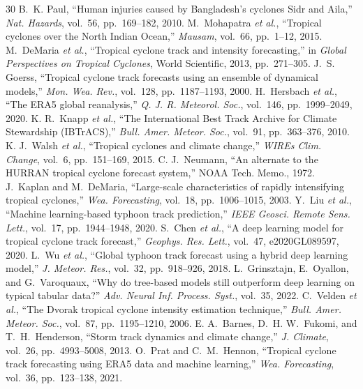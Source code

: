 \documentclass[11pt]{article}
\begin{document}
\begin{thebibliography}{30}
B.~K. Paul, ``Human injuries caused by Bangladesh's cyclones Sidr and Aila,'' \textit{Nat. Hazards}, vol.~56, pp.~169--182, 2010.
M.~Mohapatra \textit{et al.}, ``Tropical cyclones over the North Indian Ocean,'' \textit{Mausam}, vol.~66, pp.~1--12, 2015.
M.~DeMaria \textit{et al.}, ``Tropical cyclone track and intensity forecasting,'' in \textit{Global Perspectives on Tropical Cyclones}, World Scientific, 2013, pp.~271--305.
J.~S. Goerss, ``Tropical cyclone track forecasts using an ensemble of dynamical models,'' \textit{Mon. Wea. Rev.}, vol.~128, pp.~1187--1193, 2000.
H.~Hersbach \textit{et al.}, ``The ERA5 global reanalysis,'' \textit{Q. J. R. Meteorol. Soc.}, vol.~146, pp.~1999--2049, 2020.
K. R.~Knapp \textit{et al.}, ``The International Best Track Archive for Climate Stewardship (IBTrACS),'' \textit{Bull. Amer. Meteor. Soc.}, vol.~91, pp.~363--376, 2010.
K. J.~Walsh \textit{et al.}, ``Tropical cyclones and climate change,'' \textit{WIREs Clim. Change}, vol.~6, pp.~151--169, 2015.
C. J.~Neumann, ``An alternate to the HURRAN tropical cyclone forecast system,'' NOAA Tech. Memo., 1972.
J.~Kaplan and M.~DeMaria, ``Large-scale characteristics of rapidly intensifying tropical cyclones,'' \textit{Wea. Forecasting}, vol.~18, pp.~1006--1015, 2003.
Y.~Liu \textit{et al.}, ``Machine learning-based typhoon track prediction,'' \textit{IEEE Geosci. Remote Sens. Lett.}, vol.~17, pp.~1944--1948, 2020.
S.~Chen \textit{et al.}, ``A deep learning model for tropical cyclone track forecast,'' \textit{Geophys. Res. Lett.}, vol.~47, e2020GL089597, 2020.
L.~Wu \textit{et al.}, ``Global typhoon track forecast using a hybrid deep learning model,'' \textit{J. Meteor. Res.}, vol.~32, pp.~918--926, 2018.
L.~Grinsztajn, E.~Oyallon, and G.~Varoquaux, ``Why do tree-based models still outperform deep learning on typical tabular data?'' \textit{Adv. Neural Inf. Process. Syst.}, vol.~35, 2022.
C.~Velden \textit{et al.}, ``The Dvorak tropical cyclone intensity estimation technique,'' \textit{Bull. Amer. Meteor. Soc.}, vol.~87, pp.~1195--1210, 2006.
E. A.~Barnes, D.~H. W.~Fukomi, and T.~H.~Henderson, ``Storm track dynamics and climate change,'' \textit{J. Climate}, vol.~26, pp.~4993--5008, 2013.
O.~Prat and C.~M.~Hennon, ``Tropical cyclone track forecasting using ERA5 data and machine learning,'' \textit{Wea. Forecasting}, vol.~36, pp.~123--138, 2021.

\end{thebibliography}
\end{document}
